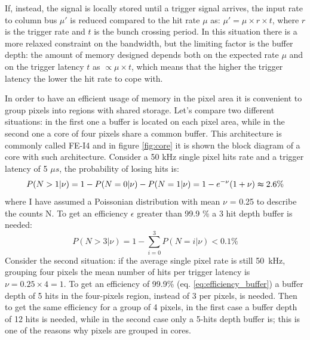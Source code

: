    If, instead, the signal is locally stored until a trigger signal arrives, the input rate to column bus $\mu '$ is reduced compared to the hit rate $\mu$ as: $\mu'=\mu \times r \times t$, where $r$ is the trigger rate and $t$ is the bunch crossing period.
   In this situation there is a more relaxed constraint on the bandwidth, but the limiting factor is the buffer depth: the amount of memory designed depends both on the expected rate $\mu$ and on the trigger latency $t$ as $\propto\mu \times t$, which means that the higher the trigger latency the lower the hit rate to cope with. 

   In order to have an efficient usage of memory in the pixel area it is convenient to group pixels into regions with shared storage. Let's compare two different situations: in the first one a buffer is located on each pixel area, while in the second one a core of four pixels share a common buffer. This architecture is commonly called FE-I4 and in figure \ref{fig:core} it is shown the block diagram of a core with such architecture.
   Consider a 50 kHz single pixel hits rate and a trigger latency of 5 $\mu s$, the probability of losing hits is: 
   \begin{equation}
      P(N > 1 | \nu) = 1-P(N = 0 | \nu) - P(N = 1 | \nu) = 1 - e^{-\nu} (1+\nu) \thickapprox 2.6 \% 
   \end{equation}    
   where I have assumed a Poissonian distribution with mean $\nu$ = 0.25 to describe the counts N. To get an efficiency $\epsilon$ greater than 99.9 \% a 3 hit depth buffer is needed: 
   \begin{equation}
      P(N > 3 | \nu) = 1-\sum_{i=0}^{3} P(N = i | \nu) < 0.1\%  
   \label{eq:efficiency_buffer}
   \end{equation} 
   Consider the second situation: if the average single pixel rate is still \SI{50}{kHz}, grouping four pixels the mean number of hits per trigger latency is $\nu = 0.25 \times 4 = 1$. To get an efficiency of 99.9\% (eq. \ref{eq:efficiency_buffer}) a buffer depth of 5 hits in the four-pixels region, instead of 3 per pixels, is needed. 
   Then to get the same efficiency for a group of 4 pixels, in the first case a buffer depth of 12 hits is needed, while in the second case only a 5-hits depth buffer is; this is one of the reasons why pixels are grouped in cores.
